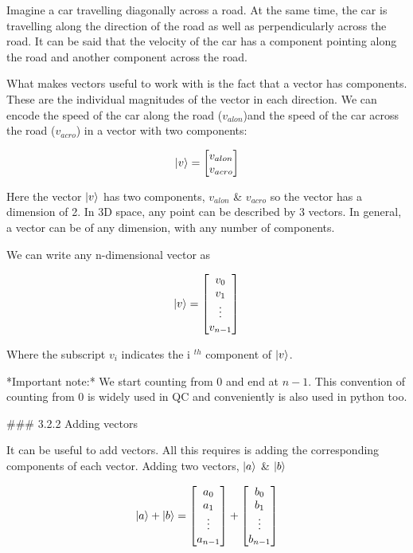 \documentclass{book}
\begin{document}
Imagine a car travelling diagonally across a road. At the same time, the car is travelling along the direction of the road as well as perpendicularly across the road. It can be said that the velocity of the car has a component pointing along the road and another component across the road. 

What makes vectors useful to work with is the fact that a vector has components. These are the individual magnitudes of the vector in each direction. We can encode the speed of the car along the road ($v_{alon}$)and the speed of the car across the road ($v_{acro}$) in a vector with two components: 

$$
\ket{v} = \begin{bmatrix}v_{alon} \\ v_{acro}
\end{bmatrix}
$$

Here the vector $\ket{v}$ has two components, $v_{alon}$ & $v_{acro}$ so the vector has a dimension of 2. In 3D space, any point can be described by 3 vectors. In general, a vector can be of any dimension, with any number of components. 

We can write any n-dimensional vector as

$$
\ket{v} = \begin{bmatrix} v_0 \\ v_1 \\ \vdots \\ v_{n-1} \end{bmatrix}
$$

Where the subscript $v_i$ indicates the i $^{th}$ component of $\ket{v}$. 

*Important note:* We start counting from 0 and end at $n-1$. This convention of counting from 0 is widely used in QC and conveniently is also used in python too. 

### 3.2.2 Adding vectors

It can be useful to add vectors. All this requires is adding the corresponding components of each vector. Adding two vectors, $\ket{a}$ & $\ket{b}$

$$\ket{a} + \ket{b} = \begin{bmatrix} a_0 \\ a_1 \\ \vdots \\ a_{n-1} \end{bmatrix} + \begin{bmatrix} b_0 \\ b_1 \\ \vdots \\ b_{n-1} \end{bmatrix}
$$
\end{document}
